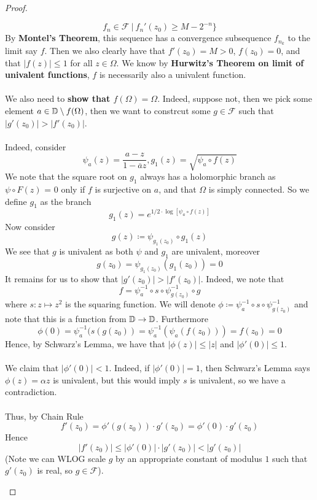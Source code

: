 \begin{proof}
\begin{enumerate}
        \[f_n \in \mathcal{F}\ |\ f_n'(z_0) \geq M - 2^{-n}\}\]
        By \textbf{Montel's Theorem}, this sequence has a convergence subsequence $f_{n_k}$ to the limit say $f$. Then we also clearly have that $f'(z_0) = M > 0$, $f(z_0) = 0$, and that $|f(z)| \leq 1$ for all $z \in \Omega$. We know by \textbf{Hurwitz's Theorem on limit of univalent functions}, $f$ is necessarily also a univalent function.\\\\
        We also need to \textbf{show that $f(\Omega) = \Omega$}. Indeed, suppose not, then we pick some element $a \in \mathbb{D} \setminus f(\Omega)$, then we want to constrcut some $g \in \mathcal{F}$ such that $|g'(z_0)| > |f'(z_0)|$.\\\\
        Indeed, consider
        \[\psi_{a}(z) = \frac{a - z}{1 - \overline{a}z}, g_1(z) = \sqrt{\psi_a \circ f(z)}\]
        We note that the square root on $g_1$ always has a holomorphic branch as $\psi \circ F(z)$ = 0 only if $f$ is surjective on $a$, and that $\Omega$ is simply connected. So we define $g_1$ as the branch
        \[g_1(z) = e^{1/2 \cdot \log[\psi_a \circ f(z)]}\]
        Now consider
        \[g(z) \coloneqq \psi_{g_1(z_0)} \circ g_1(z)\]
        We see that $g$ is univalent as both $\psi$ and $g_1$ are univalent, moreover
        \[g(z_0) = \psi_{g_1(z_0)}(g_1(z_0)) = 0\]
        It remains for us to show that $|g'(z_0)| > |f'(z_0)|$. Indeed, we note that
        \[f = \psi_a^{-1} \circ s \circ \psi_{g(z_0)}^{-1} \circ g\]
        where $s: z \mapsto z^2$ is the squaring function. We will denote $\phi \coloneqq \psi_a^{-1} \circ s \circ \psi_{g(z_0)}^{-1}$ and note that this is a function from $\mathbb{D} \to \mathbb{D}$. Furthermore
        \[\phi(0) = \psi_a^{-1}(s(g(z_0)) = \psi_a^{-1}(\psi_a(f(z_0))) = f(z_0) = 0\]
        Hence, by Schwarz's Lemma, we have that $|\phi(z)| \leq |z|$ and $|\phi'(0)| \leq 1$.\\\\
        We claim that $|\phi'(0)| < 1$. Indeed, if $|\phi'(0)| = 1$, then Schwarz's Lemma says $\phi(z) = \alpha z$ is univalent, but this would imply $s$ is univalent, so we have a contradiction.\\\\
        Thus, by Chain Rule
        \[f'(z_0) = \phi'(g(z_0)) \cdot g'(z_0) = \phi'(0) \cdot g'(z_0)\]
        Hence
        \[|f'(z_0)| \leq |\phi'(0)| \cdot |g'(z_0)| < |g'(z_0)|\]
        (Note we can WLOG scale $g$ by an appropriate constant of modulus $1$ such that $g'(z_0)$ is real, so $g \in \mathcal{F}$).
    \end{enumerate}
\end{proof}

